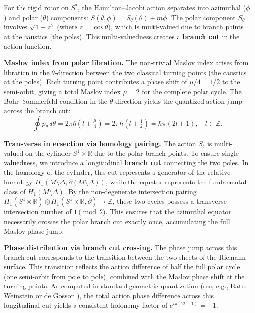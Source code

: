 \documentclass[11pt]{article}
\begin{document}
For the rigid rotor on $S^2$, the Hamilton--Jacobi action separates into
azimuthal ($\phi$) and polar ($\theta$) components: $S(\theta, \phi) = S_\theta(\theta) + m\phi$.
The polar component $S_\theta$ involves $\sqrt{1-z^2}$ (where $z = \cos\theta$),
which is multi-valued due to branch points at the caustics (the poles).
This multi-valuedness creates a \textbf{branch cut} in the action function.

\textbf{Maslov index from polar libration.}
The non-trivial Maslov index arises from libration in the $\theta$-direction
between the two classical turning points (the caustics at the poles).
Each turning point contributes a phase shift of $\mu/4 = 1/2$ to the
semi-orbit, giving a total Maslov index $\mu = 2$ for the complete polar cycle.
The Bohr--Sommerfeld condition in the $\theta$-direction yields the quantized
action jump across the branch cut:
\[
\oint p_\theta\,d\theta = 2\pi\hbar\!\left(l + \tfrac{\mu}{4}\right)
= 2\pi\hbar\!\left(l + \tfrac{1}{2}\right) = \hbar\pi(2l+1), \quad l \in \mathbb{Z}.
\]

\textbf{Transverse intersection via homology pairing.}
The action $S_\theta$ is multi-valued on the cylinder $S^1 \times \mathbb{R}$ due to
the polar branch points. To ensure single-valuedness, we introduce a longitudinal
\textbf{branch cut} connecting the two poles. In the homology of the cylinder,
this cut represents a generator of the relative homology $H_1(M \setminus \Delta, \partial(M \setminus \Delta))$,
while the equator represents the fundamental class of $H_1(M \setminus \Delta)$.
By the non-degenerate intersection pairing
$H_1(S^1 \times \mathbb{R}) \otimes H_1(S^1 \times \mathbb{R}, \partial) \to \mathbb{Z}$,
these two cycles possess a transverse intersection number of $1 \pmod{2}$.
This ensures that the azimuthal equator necessarily crosses the polar branch cut
exactly once, accumulating the full Maslov phase jump.

\textbf{Phase distribution via branch cut crossing.}
The phase jump across this branch cut corresponds to the transition between
the two sheets of the Riemann surface. This transition reflects the action
difference of half the full polar cycle (one semi-orbit from pole to pole),
combined with the Maslov phase shift at the turning points. As computed in
standard geometric quantization (see, e.g., Bates--Weinstein \cite[\S~7.4]{BW97}
or de Gosson \cite[Ch.~8]{Gos11}), the total action phase difference across
this longitudinal cut yields a consistent holonomy factor of
$e^{i\pi(2l+1)} = -1$.
\end{document}
